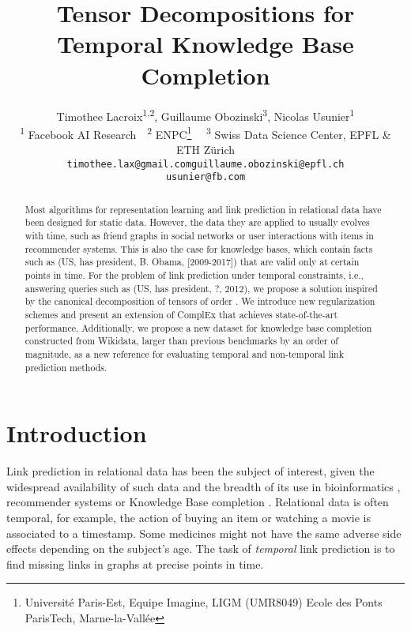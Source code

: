 \documentclass{article}
\title{Tensor Decompositions for\\ Temporal \mbox{Knowledge} Base Completion}
\author{
Timothee Lacroix\textsuperscript{1,2}, Guillaume Obozinski\textsuperscript{3}, Nicolas Usunier\textsuperscript{1} \\
\textsuperscript{1} Facebook AI Research~~\textsuperscript{2} ENPC\thanks{Université Paris-Est, Equipe Imagine, LIGM (UMR8049) Ecole des Ponts ParisTech, Marne-la-Vallée}~~
\textsuperscript{3} Swiss Data Science Center, EPFL \& ETH Zürich\\
\texttt{timothee.lax@gmail.com}\quad\texttt{guillaume.obozinski@epfl.ch}\\
\texttt{usunier@fb.com}\\
}
\begin{document}
\maketitle

\begin{abstract}




    Most algorithms for representation learning and link prediction in relational data have been designed for static data. However, the data they are applied to usually evolves with time, such as friend graphs in social networks or user interactions with items in recommender systems. This is also the case for knowledge bases, which contain facts such as (US, has president, B. Obama, [2009-2017]) that are valid only at certain points in time. For the problem of link prediction under temporal constraints, i.e., answering queries such as (US, has president, ?, 2012), we propose a solution inspired by the canonical decomposition of tensors of order .  
    We introduce new regularization schemes and present an extension of ComplEx \citep{trouillon_complex_2016} that achieves state-of-the-art performance. Additionally, we propose a new dataset for knowledge base completion constructed from Wikidata, larger than previous benchmarks by an order of magnitude, as a new reference for evaluating temporal and non-temporal link prediction methods. 
\end{abstract}





\section{Introduction}
Link prediction in relational data has been the subject of interest, given the widespread availability of such data and the breadth of its use in bioinformatics \citep{Zitnik2018}, recommender systems \citep{koren_matrix_2009} or Knowledge Base completion \citep{nickel_review_2016}. Relational data is often temporal, for example, the action of buying an item or watching a movie is associated to a timestamp. Some medicines might not have the same adverse side effects depending on the subject's age. The task of \emph{temporal} link prediction is to find missing links in graphs at precise points in time.
\end{document}
